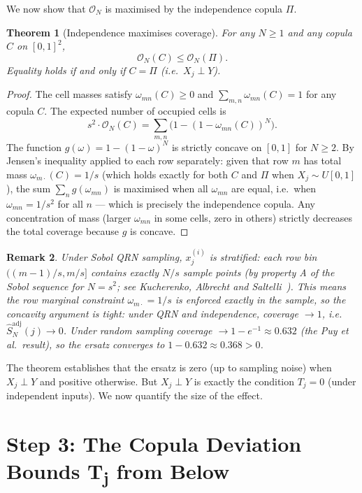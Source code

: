 \documentclass[11pt,a4paper]{article}
\newtheorem{theorem}{Theorem}
\newtheorem{remark}[theorem]{Remark}
\theoremstyle{definition}
\begin{document}
We now show that $\mathcal{O}_N$ is maximised by the independence copula $\Pi$.

\begin{theorem}[Independence maximises coverage]
\label{thm:coverage}
For any $N \ge 1$ and any copula $C$ on $[0,1]^2$,
\[
  \mathcal{O}_N(C) \le \mathcal{O}_N(\Pi).
\]
Equality holds if and only if $C = \Pi$ (i.e.\ $X_j \perp Y$).
\end{theorem}

\begin{proof}
The cell masses satisfy $\omega_{mn}(C) \ge 0$ and $\sum_{m,n}
\omega_{mn}(C) = 1$ for any copula $C$.  The expected number of occupied
cells is
\[
  s^2 \cdot \mathcal{O}_N(C) = \sum_{m,n} \bigl(1 - (1-\omega_{mn}(C))^N\bigr).
\]
The function $g(\omega) = 1 - (1-\omega)^N$ is strictly concave on $[0,1]$
for $N \ge 2$.  By Jensen's inequality applied to each row separately:
given that row $m$ has total mass $\omega_{m\cdot}(C) = 1/s$ (which holds
exactly for both $C$ and $\Pi$ when $X_j \sim U[0,1]$), the sum
$\sum_n g(\omega_{mn})$ is maximised when all $\omega_{mn}$ are equal,
i.e.\ when $\omega_{mn} = 1/s^2$ for all $n$ — which is precisely the
independence copula.  Any concentration of mass (larger $\omega_{mn}$ in
some cells, zero in others) strictly decreases the total coverage because
$g$ is concave.
\end{proof}

\begin{remark}
Under Sobol QRN sampling, $x_j^{(i)}$ is \emph{stratified}: each row bin
$((m-1)/s, m/s]$ contains exactly $N/s$ sample points (by property A of
the Sobol sequence for $N = s^2$; see Kucherenko, Albrecht and Saltelli~\cite{kucherenko2015}).  This means the row marginal constraint $\omega_{m\cdot} = 1/s$ is
enforced \emph{exactly} in the sample, so the concavity argument is
tight: under QRN and independence, coverage $\to 1$, i.e.\
$\hat{S}^{\mathrm{adj}}_N(j) \to 0$.  Under random sampling coverage
$\to 1 - e^{-1} \approx 0.632$ (the Puy et al.\ result), so the
ersatz converges to $1 - 0.632 \approx 0.368 > 0$.
\end{remark}

The theorem establishes that the ersatz is zero (up to sampling noise)
when $X_j \perp Y$ and positive otherwise.  But $X_j \perp Y$ is exactly
the condition $T_j = 0$ (under independent inputs).  We now quantify the
size of the effect.

\section{Step 3: The Copula Deviation Bounds T\textsubscript{j} from Below}
\end{document}
